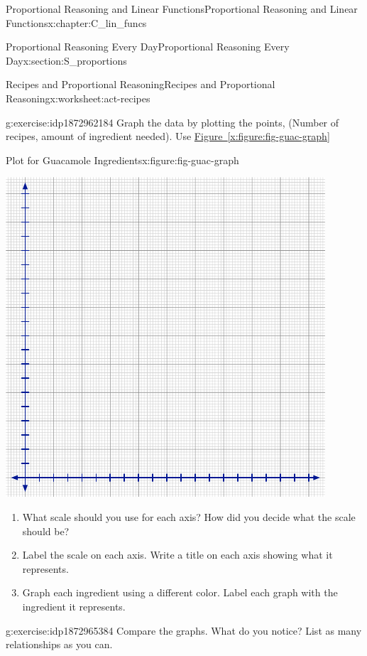 \documentclass[oneside,10pt,]{book}
\newcommand{\xreffont}{\relax}
\numberwithin{equation}{chapter}
\begin{document}
\begin{chapterptx}{Proportional Reasoning and Linear Functions}{}{Proportional Reasoning and Linear Functions}{}{}{x:chapter:C_lin_funcs}
\begin{sectionptx}{Proportional Reasoning Every Day}{}{Proportional Reasoning Every Day}{}{}{x:section:S_proportions}
\begin{worksheet-subsection}{Recipes and Proportional Reasoning}{}{Recipes and Proportional Reasoning}{}{}{x:worksheet:act-recipes}
\begin{divisionexercise}{4}{}{}{g:exercise:idp1872962184}%
Graph the data by plotting the points, (Number of recipes, amount of ingredient needed). Use \hyperref[x:figure:fig-guac-graph]{Figure~{\xreffont\ref{x:figure:fig-guac-graph}}}%
\begin{figureptx}{Plot for Guacamole Ingredients}{x:figure:fig-guac-graph}{}%
\begin{image}{0.05}{0.9}{0.05}%
\includegraphics[width=\linewidth]{external/blank-graph.pdf}
\end{image}%
\tcblower
\end{figureptx}%
\begin{enumerate}[font=\bfseries,label=(\alph*),ref=\alph*]
\item{}What scale should you use for each axis? How did you decide what the scale should be?%
\item{}Label the scale on each axis. Write a title on each axis showing what it represents.%
\item{}Graph each ingredient using a different color. Label each graph with the ingredient it represents.%
\end{enumerate}
\end{divisionexercise}%
\begin{divisionexercise}{5}{}{}{g:exercise:idp1872965384}%
Compare the graphs. What do you notice? List as many relationships as you can.%

\end{divisionexercise}
\end{worksheet-subsection}
\end{sectionptx}
\end{chapterptx}
\end{document}
